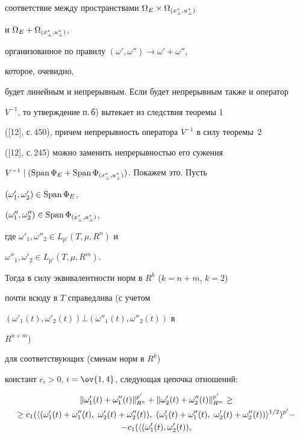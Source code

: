 \begin{pf}
соответствие между пространствами $\Omega_E\times\Omega_{{(x^*_{\bot},u^*_{\bot})}}$ 


и $\Omega_E+\Omega_{{(x^*_{\bot},u^*_{\bot})}}$, 


организованное по правилу $(\omega',\omega'')\to\omega'+\omega''$, 


которое, очевидно, 


будет линейным и непрерывным. Если будет непрерывным также и оператор 


$V^{-1}$, то утверждение п.\,б) вытекает из следствия теоремы 1 


([12], с.\,450), причем непрерывность оператора $V^{-1}$ в силу теоремы~2 


([12], с.\,245) можно заменить непрерывностью его сужения 


$V^{-1}\mid(\operatorname{Span}\Phi_E+\operatorname{Span}\Phi_{{(x^*_{\bot},u^*_{\bot})}})$. Покажем это. Пусть 


$(\omega'_1,\omega'_2)\in\operatorname{Span}\Phi_E$, 


$(\omega''_1,\omega''_2)\in\operatorname{Span}\Phi_{{(x^*_{\bot},u^*_{\bot})}}$, 


где $\omega'_1,\omega''_2\in L_{p'}(T,\mu,R^n)$ и 


$\omega''_1,\omega'_2\in L_{p'}(T,\mu,R^m)$. 


Тогда в силу эквивалентности норм в $R^k$ ($k=n+m$, $k=2$) 


почти всюду в $T$ справедлива (с учетом 


$(\omega'_1(t),\omega'_2(t))\bot(\omega''_1(t),\omega''_2(t))$ в 


$R^{n+m}$) 


для соответствующих (сменам норм в $R^k$) 


констант $c_i>0$, $i=\ov{1,4}$, следующая цепочка отношений: 


\begin{gather*} 


\|\omega'_1(t)+\omega''_1(t)\|^{p'}_{R^n}+ 


\|\omega'_2(t)+\omega''_2(t)\|^{p'}_{R^m}\ge \\ 


% 


\ge c_1(\la(\omega'_1(t)+\omega''_1(t), 


\ \omega'_2(t)+\omega''_2(t)), 


\ (\omega'_1(t)+\omega''_1(t), 


\ \omega'_2(t)+\omega''_2(t))\ra^{1/2})^{p'}- \\ 


% 


-c_1(\la(\omega'_1(t),\omega'_2(t)), 



\end{gather*}
\end{pf}
